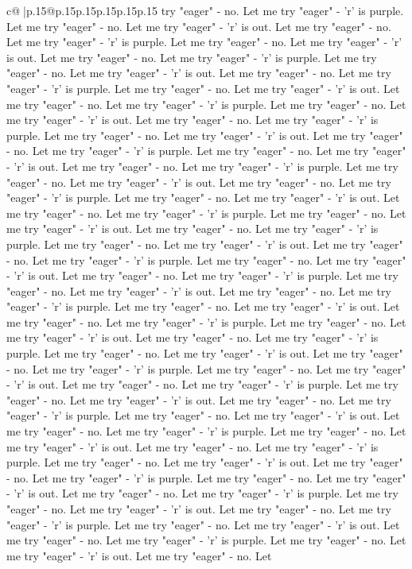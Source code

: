 \documentclass{article}
\begin{document}
{\begin{supertabular}{c@{$\;$}|p{.15\linewidth}@{}p{.15\linewidth}p{.15\linewidth}p{.15\linewidth}p{.15\linewidth}p{.15\linewidth}}
{{{try "eager" {-} no. Let me try "eager" {-} 'r' is purple. Let me try "eager" {-} no. Let me try "eager" {-} 'r' is out. Let me try "eager" {-} no. Let me try "eager" {-} 'r' is purple. Let me try "eager" {-} no. Let me try "eager" {-} 'r' is out. Let me try "eager" {-} no. Let me try "eager" {-} 'r' is purple. Let me try "eager" {-} no. Let me try "eager" {-} 'r' is out. Let me try "eager" {-} no. Let me try "eager" {-} 'r' is purple. Let me try "eager" {-} no. Let me try "eager" {-} 'r' is out. Let me try "eager" {-} no. Let me try "eager" {-} 'r' is purple. Let me try "eager" {-} no. Let me try "eager" {-} 'r' is out. Let me try "eager" {-} no. Let me try "eager" {-} 'r' is purple. Let me try "eager" {-} no. Let me try "eager" {-} 'r' is out. Let me try "eager" {-} no. Let me try "eager" {-} 'r' is purple. Let me try "eager" {-} no. Let me try "eager" {-} 'r' is out. Let me try "eager" {-} no. Let me try "eager" {-} 'r' is purple. Let me try "eager" {-} no. Let me try "eager" {-} 'r' is out. Let me try "eager" {-} no. Let me try "eager" {-} 'r' is purple. Let me try "eager" {-} no. Let me try "eager" {-} 'r' is out. Let me try "eager" {-} no. Let me try "eager" {-} 'r' is purple. Let me try "eager" {-} no. Let me try "eager" {-} 'r' is out. Let me try "eager" {-} no. Let me try "eager" {-} 'r' is purple. Let me try "eager" {-} no. Let me try "eager" {-} 'r' is out. Let me try "eager" {-} no. Let me try "eager" {-} 'r' is purple. Let me try "eager" {-} no. Let me try "eager" {-} 'r' is out. Let me try "eager" {-} no. Let me try "eager" {-} 'r' is purple. Let me try "eager" {-} no. Let me try "eager" {-} 'r' is out. Let me try "eager" {-} no. Let me try "eager" {-} 'r' is purple. Let me try "eager" {-} no. Let me try "eager" {-} 'r' is out. Let me try "eager" {-} no. Let me try "eager" {-} 'r' is purple. Let me try "eager" {-} no. Let me try "eager" {-} 'r' is out. Let me try "eager" {-} no. Let me try "eager" {-} 'r' is purple. Let me try "eager" {-} no. Let me try "eager" {-} 'r' is out. Let me try "eager" {-} no. Let me try "eager" {-} 'r' is purple. Let me try "eager" {-} no. Let me try "eager" {-} 'r' is out. Let me try "eager" {-} no. Let me try "eager" {-} 'r' is purple. Let me try "eager" {-} no. Let me try "eager" {-} 'r' is out. Let me try "eager" {-} no. Let me try "eager" {-} 'r' is purple. Let me try "eager" {-} no. Let me try "eager" {-} 'r' is out. Let me try "eager" {-} no. Let me try "eager" {-} 'r' is purple. Let me try "eager" {-} no. Let me try "eager" {-} 'r' is out. Let me try "eager" {-} no. Let me try "eager" {-} 'r' is purple. Let me try "eager" {-} no. Let me try "eager" {-} 'r' is out. Let me try "eager" {-} no. Let me try "eager" {-} 'r' is purple. Let me try "eager" {-} no. Let me try "eager" {-} 'r' is out. Let me try "eager" {-} no. Let me try "eager" {-} 'r' is purple. Let me try "eager" {-} no. Let me try "eager" {-} 'r' is out. Let me try "eager" {-} no. Let me try "eager" {-} 'r' is purple. Let me try "eager" {-} no. Let me try "eager" {-} 'r' is out. Let me try "eager" {-} no. Let me try "eager" {-} 'r' is purple. Let me try "eager" {-} no. Let me try "eager" {-} 'r' is out. Let me try "eager" {-} no. Let }}}
\end{supertabular}}
\end{document}
